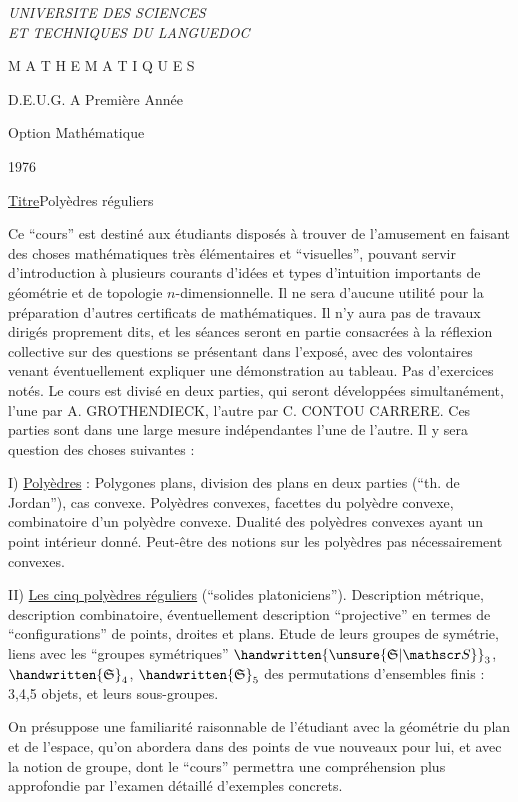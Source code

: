 {\itshape
UNIVERSITE DES SCIENCES\\
ET TECHNIQUES DU LANGUEDOC

M A T H E M A T I Q U E S

D.E.U.G. A Première Année

Option Mathématique

1976

\uline{Titre}\qquad Polyèdres réguliers

Ce ``cours'' est destiné aux étudiants disposés à trouver de l'amusement en faisant des choses mathématiques très élémentaires et ``visuelles'', pouvant servir d'introduction à plusieurs courants d'idées et types d'intuition importants de géométrie et de topologie $n$-dimensionnelle. Il ne sera d'aucune utilité pour la préparation d'autres certificats de mathématiques. Il n'y aura pas de travaux dirigés proprement dits, et les séances seront en partie consacrées à la réflexion collective sur des questions se présentant dans l'exposé, avec des volontaires venant éventuellement expliquer une démonstration au tableau. Pas d'exercices notés. Le cours est divisé en deux parties, qui seront développées simultanément, l'une par A. GROTHENDIECK, l'autre par C. CONTOU CARRERE. Ces parties sont dans une large mesure indépendantes l'une de l'autre. Il y sera question des choses suivantes :

I) \uline{Polyèdres} : Polygones plans, division des plans en deux parties (``th. de Jordan''), cas convexe. Polyèdres convexes, facettes du polyèdre convexe, combinatoire d'un polyèdre convexe. Dualité des polyèdres convexes ayant un point intérieur donné. Peut-être des notions sur les polyèdres pas nécessairement convexes.

II) \uline{Les cinq polyèdres réguliers} (``solides platoniciens''). Description métrique, description combinatoire, éventuellement description ``projective'' en termes de ``configurations'' de points, droites et plans. Etude de leurs groupes de symétrie, liens avec les ``groupes symétriques'' $\handwritten{\unsure{\mathfrak S|\mathscr S}}_3$, $\handwritten{\mathfrak S}_4$, $\handwritten{\mathfrak S}_5$ des permutations d'ensembles finis : 3,4,5 objets, et leurs sous-groupes.

On présuppose une familiarité raisonnable de l'étudiant avec la géométrie du plan et de l'espace, qu'on abordera dans des points de vue nouveaux pour lui, et avec la notion de groupe, dont le ``cours'' permettra une compréhension plus approfondie par l'examen détaillé d'exemples concrets.
}
